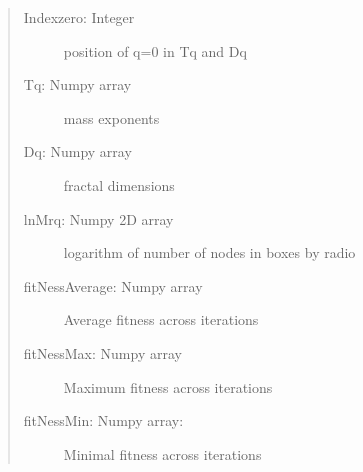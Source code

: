 \documentclass[letterpaper,10pt,english]{sphinxmanual}
\begin{document}
\begin{fulllineitems}
\begin{quote}
\begin{description}
\begin{description}
\item[{Indexzero: Integer}] \leavevmode
position of q=0 in Tq and Dq

\item[{Tq: Numpy array}] \leavevmode
mass exponents

\item[{Dq: Numpy array}] \leavevmode
fractal dimensions

\item[{lnMrq: Numpy 2D array}] \leavevmode
logarithm of number of nodes in boxes by radio

\item[{fitNessAverage: Numpy array}] \leavevmode
Average fitness across iterations

\item[{fitNessMax: Numpy array}] \leavevmode
Maximum fitness across iterations

\item[{fitNessMin: Numpy array:}] \leavevmode
Minimal fitness across iterations

\end{description}


\end{description}\end{quote}

\end{fulllineitems}

\end{document}
